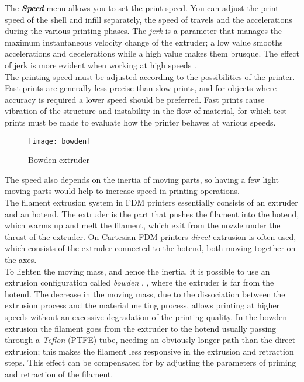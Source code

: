 The \emph{\textbf{Speed}} menu allows you to set the print speed. You can adjust the print speed of the shell and infill separately, the speed of travels and the accelerations during the various printing phases.
The \emph{jerk} is a parameter that manages the maximum instantaneous velocity change of the extruder; a low value smooths accelerations and decelerations while a high value makes them brusque. The effect of jerk is more evident when working at high speeds \parencite{Reference53}. \\
The printing speed must be adjusted according to the possibilities of the printer. Fast prints are generally less precise than slow prints, and for objects where accuracy is required a lower speed should be preferred. Fast prints cause vibration of the structure and instability in the flow of material, for which test prints must be made to evaluate how the printer behaves at various speeds.

\begin{wrapfigure} {R} {0.4\textwidth}
	\texttt{[image: bowden]}
    \caption{Bowden extruder}
    \label{fig:bowden}
\end{wrapfigure}

The speed also depends on the inertia of moving parts, so having a few light moving parts would help to increase speed in printing operations.\\
The filament extrusion system in FDM printers essentially consists of an extruder and an hotend. The extruder is the part that pushes the filament into the hotend, which warms up and melt the filament, which exit from the nozzle under the thrust of the extruder. On Cartesian FDM printers \emph{direct} extrusion is often used, which consists of the extruder connected to the hotend, both moving together on the axes.\\
To lighten the moving mass, and hence the inertia, it is possible to use an extrusion configuration called \emph{bowden} \parencite{Reference54}, \parencite{Reference55}, where the extruder is far from the hotend. The decrease in the moving mass, due to the dissociation between the extrusion process and the material melting process, allows printing at higher speeds without an excessive degradation of the printing quality. In the bowden extrusion the filament goes from the extruder to the hotend usually passing through a \emph{Teflon} (PTFE) tube, needing an obviously longer path than the direct extrusion; this makes the filament less responsive in the extrusion and retraction steps. This effect can be compensated for by adjusting the parameters of priming and retraction of the filament.

